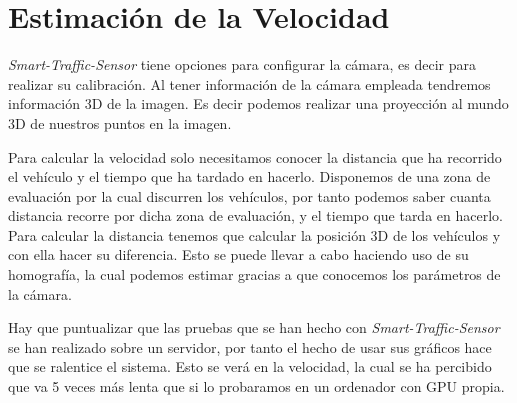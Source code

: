\section{Estimación de la Velocidad}

\textit{Smart-Traffic-Sensor} tiene opciones para configurar la cámara, es decir para realizar su calibración. Al tener información de la cámara empleada tendremos información 3D de la imagen. Es decir podemos realizar una proyección al mundo 3D de nuestros puntos en la imagen.

Para calcular la velocidad solo necesitamos conocer la distancia que ha recorrido el vehículo y el tiempo que ha tardado en hacerlo. Disponemos de una zona de evaluación por la cual discurren los vehículos, por tanto podemos saber cuanta distancia recorre por dicha zona de evaluación, y el tiempo que tarda en hacerlo. Para calcular la distancia tenemos que calcular la posición 3D de los vehículos y con ella hacer su diferencia. Esto se puede llevar a cabo haciendo uso de su homografía, la cual podemos estimar gracias a que conocemos los parámetros de la cámara.

Hay que puntualizar que las pruebas que se han hecho con \textit{Smart-Traffic-Sensor} se han realizado sobre un servidor, por tanto el hecho de usar sus gráficos hace que se ralentice el sistema. Esto se verá en la velocidad, la cual se ha percibido que va 5 veces más lenta que si lo probaramos en un ordenador con GPU propia.



